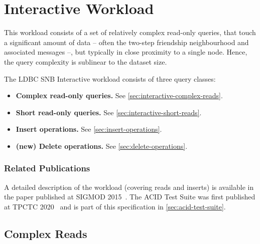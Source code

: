 \chapter{Interactive Workload}
\label{sec:interactive}

This workload consists of a set of relatively complex read-only queries, that touch a significant
amount of data -- often the two-step friendship neighbourhood and associated messages --, but typically in close proximity to a single node. Hence, the query complexity is sublinear to the dataset size.

The LDBC SNB Interactive workload consists of three query classes:

\begin{itemize}
\item \textbf{Complex read-only queries.} See \autoref{sec:interactive-complex-reads}.
\item \textbf{Short read-only queries.} See \autoref{sec:interactive-short-reads}.
\item \textbf{Insert operations.} See \autoref{sec:insert-operations}.
\item \textbf{(new) Delete operations.} See \autoref{sec:delete-operations}.
\end{itemize}

\subsection*{Related Publications}

A detailed description of the workload (covering reads and inserts) is available in the paper published at \mbox{SIGMOD} 2015~\cite{DBLP:conf/sigmod/ErlingALCGPPB15}. The ACID Test Suite was first published at TPCTC 2020~\cite{DBLP:conf/tpctc/WaudbySKMBS20} and is part of this specification in \autoref{sec:acid-test-suite}.


\section{Complex Reads}
\label{sec:interactive-complex-reads}




